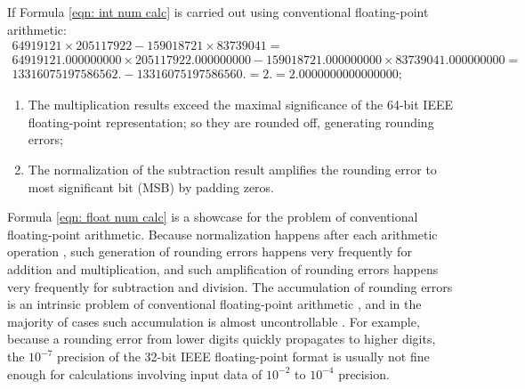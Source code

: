 \documentclass[twoside]{article}
\numberwithin{equation}{section}
\begin{document}
If Formula \eqref{eqn: int num calc} is carried out using conventional floating-point arithmetic: 
\begin{multline}
\label{eqn: float num calc}
64919121 \times 205117922 - 159018721 \times 83739041 =\\ 
64919121.000000000 \times 205117922.000000000 - 159018721.000000000 \times 83739041.000000000 =\\
13316075197586562. - 13316075197586560. = 2. = 2.0000000000000000;
\end{multline}
\begin{enumerate}
\item  The multiplication results exceed the maximal significance of the 64-bit IEEE floating-point representation; so they are rounded off, generating rounding errors;
\item  The normalization of the subtraction result amplifies the rounding error to most significant bit (MSB) by padding zeros.
\end{enumerate}

\noindent Formula \eqref{eqn: float num calc} is a showcase for the problem of conventional floating-point arithmetic.  
Because normalization happens after each arithmetic operation \cite{Computer_Architecture}\cite{Floating_Point_Arithmetic}\cite{Floating_Point_Standard}, such generation of rounding errors happens very frequently for addition and multiplication, and such amplification of rounding errors happens very frequently for subtraction and division.  
The accumulation of rounding errors is an intrinsic problem of conventional floating-point arithmetic \cite{Numerical_Recipes}, and in the majority of cases such accumulation is almost uncontrollable \cite{Arithmetic_Digital_Computers}.  
For example, because a rounding error from lower digits quickly propagates to higher digits, the $10^{-7}$ precision of the 32-bit IEEE floating-point format \cite{Computer_Architecture}\cite{Floating_Point_Arithmetic}\cite{Floating_Point_Standard} is usually not fine enough for calculations involving input data of $10^{-2}$ to $10^{-4}$ precision.
\end{document}
